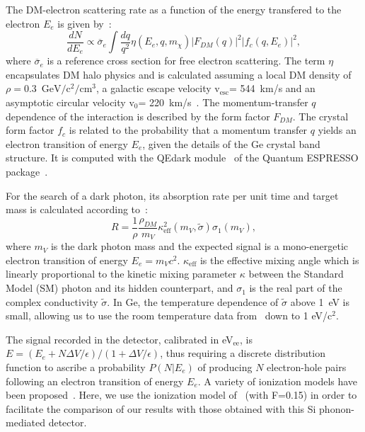 \documentclass[aps,nofootinbib,floatfix,showpacs,preprintnumbers,twocolumn,superscriptaddress]{revtex4}
\begin{document}
The DM-electron scattering rate as a function of the energy transfered to the electron $E_e$ is given by~\cite{Essig2016}:
\begin{equation}
    \frac{dN}{{dE}_{e}}\propto {\overline{\sigma}}_{e} \int \frac{d q}{q^2} \eta(E_{e},q,m_{\chi})|F_{DM}(q)|^2 |f_{c}(q,E_{e})|^2,
    \label{eq:ERDM}
\end{equation}
where ${\overline{\sigma}}_{e}$ is a reference cross section for free electron scattering. 
The term $\eta$ encapsulates DM halo physics and is calculated assuming a local DM density of $\rho=0.3$~$\mathrm{GeV}/\mathrm{c^2}/\mathrm{cm^3}$, a galactic escape velocity $\mathrm{v_{esc}}$= 544~km/s and an asymptotic circular velocity $\mathrm{v_{0}}$= 220~km/s~\cite{standardassumptions1,standardassumptions2}. 
The momentum-transfer $q$ dependence of the interaction is described by the form factor $F_{DM}$. 
The crystal form factor $f_{c}$ is related to the probability that a momentum transfer $q$ yields an electron transition of energy $E_e$, given the details of the Ge crystal band structure.
It is computed with the QEdark module~\cite{Essig2016} of the Quantum ESPRESSO package~\cite{QUANTUM-EXPRESSO}. 

For the search of a dark photon, its absorption rate per unit time and target mass is calculated according to~\cite{DarkPhotonAbsorption}:
\begin{equation}
    R=\frac{1}{\rho}\frac{\rho_{DM}}{m_{V}}\kappa^{2}_{\mathrm{eff}}(m_V,\tilde{\sigma})\sigma_1(m_V),
    \label{eq:DP}
\end{equation}
where $m_{V}$ is the dark photon mass and the expected signal is a mono-energetic electron transition of energy $E_e=m_Vc^2$. $\kappa_{\mathrm{eff}}$ is the effective mixing angle which is linearly proportional to the kinetic mixing parameter $\kappa$ between the Standard Model (SM) photon and its hidden counterpart, and $\sigma_1$ is the real part of the complex conductivity $\tilde{\sigma}$. In Ge, the temperature dependence of $\tilde{\sigma}$ above 1~eV is small, allowing us to use the room temperature data from~\cite{DarkPhotonAbsorption} down to 1 eV/c$^2$.

The signal recorded in the detector, calibrated in eV$_{\mathrm{ee}}$, is $E=(E_e + N\Delta V /\epsilon)/(1+\Delta V /\epsilon)$, thus requiring a discrete distribution function to ascribe a probability $P(N|E_e)$ of producing $N$ electron-hole pairs following an electron transition of energy $E_e$. A variety of ionization models have been proposed~\cite{COMPoisson,Essig2016,CDMS-2019-erratum}. Here, we use the ionization model of~\cite{CDMS-2019-erratum} (with F=0.15) in order to facilitate the comparison of our results with those obtained with this Si phonon-mediated detector.\\
\end{document}
